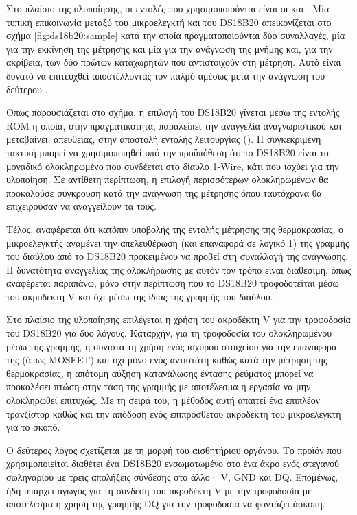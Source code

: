 Στο πλαίσιο της υλοποίησης, οι εντολές που χρησιμοποιούνται είναι οι  και . Μία τυπική επικοινωνία μεταξύ του μικροελεγκτή και
του DS18B20 απεικονίζεται στο σχήμα \ref{fig:ds18b20:sample} κατά την οποία
πραγματοποιούνται δύο συναλλαγές, μία για την εκκίνηση της μέτρησης και μία για
την ανάγνωση της μνήμης και, για την ακρίβεια, των δύο πρώτων καταχωρητών που
αντιστοιχούν στη μέτρηση. Αυτό είναι δυνατό να επιτευχθεί αποστέλλοντας τον
παλμό  αμέσως μετά την ανάγνωση του δεύτερου .

Όπως παρουσιάζεται στο σχήμα, η επιλογή του DS18B20 γίνεται μέσω της εντολής
 ROM η οποία, στην πραγματικότητα, παραλείπει την αναγγελία
αναγνωριστικού και μεταβαίνει, απευθείας, στην αποστολή εντολής λειτουργίας
(). Η συγκεκριμένη τακτική μπορεί να χρησιμοποιηθεί υπό την
προϋπόθεση ότι το DS18B20 είναι το μοναδικό ολοκληρωμένο που συνδέεται στο
δίαυλο 1-Wire, κάτι που ισχύει για την υλοποίηση. Σε αντίθετη περίπτωση, η
επιλογή περισσότερων ολοκληρωμένων θα προκαλούσε σύγκρουση κατά την ανάγνωση της
μέτρησης όπου ταυτόχρονα θα επιχειρούσαν να αναγγείλουν τα  τους.

Τέλος, αναφέρεται ότι κατόπιν υποβολής της εντολής μέτρησης της θερμοκρασίας, ο
μικροελεγκτής αναμένει την απελευθέρωση (και επαναφορά σε λογικό 1) της γραμμής
του διαύλου από το DS18B20 προκειμένου να προβεί στη συναλλαγή της ανάγνωσης. Η
δυνατότητα αναγγελίας της ολοκλήρωσης με αυτόν τον τρόπο είναι διαθέσιμη, όπως
αναφέρεται παραπάνω, μόνο στην περίπτωση που το DS18B20 τροφοδοτείται μέσω του
ακροδέκτη V και όχι μέσω της ίδιας της γραμμής του διαύλου.

Στο πλαίσιο της υλοποίησης επιλέγεται η χρήση του ακροδέκτη V για την
τροφοδοσία του DS18B20 για δύο λόγους.
Καταρχήν, για τη τροφοδοσία του ολοκληρωμένου μέσω της γραμμής, η
\textcite[5]{ds18b20} συνιστά τη χρήση ενός ισχυρού στοιχείου για την επαναφορά
της (όπως MOSFET) και όχι μόνο ενός αντιστάτη καθώς κατά την μέτρηση της
θερμοκρασίας, η απότομη αύξηση κατανάλωσης έντασης ρεύματος μπορεί να προκαλέσει
πτώση στην τάση της γραμμής με αποτέλεσμα η εργασία να μην ολοκληρωθεί επιτυχώς.
Με τη σειρά του, η μέθοδος αυτή απαιτεί ένα επιπλέον τρανζίστορ καθώς και την
απόδοση ενός επιπρόσθετου ακροδέκτη του μικροελεγκτή για το σκοπό.

Ο δεύτερος λόγος σχετίζεται με τη μορφή του αισθητήριου οργάνου. Το προϊόν που
χρησιμοποιείται διαθέτει ένα DS18B20 ενσωματωμένο στο ένα άκρο ενός στεγανού
σωληναρίου με τρεις απολήξεις σύνδεσης στο άλλο· V, GND και DQ.
Επομένως, ήδη υπάρχει αγωγός για τη σύνδεση του ακροδέκτη V με την
τροφοδοσία με αποτέλεσμα η χρήση της γραμμής DQ για την τροφοδοσία να φαντάζει
άσκοπη.


